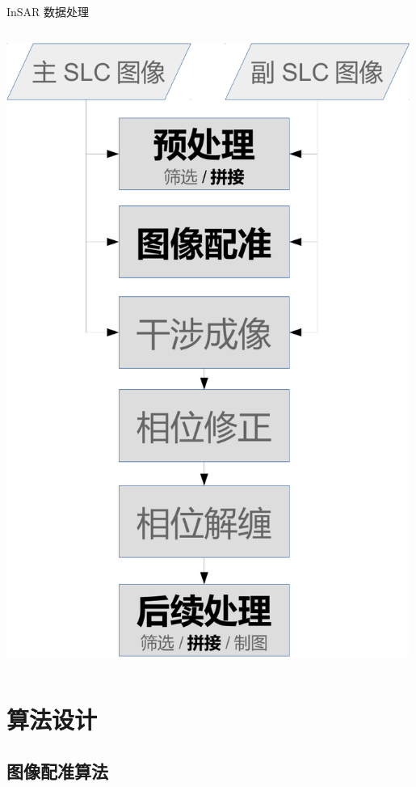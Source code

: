 \documentclass{beamer}
\begin{document}
\begin{frame}{InSAR 数据处理}
\begin{columns}
\begin{column}{0.4\textwidth}
            \includegraphics[width=0.99\textwidth]{figures/process.pdf}
        \end{column}
    \end{columns}
\end{frame}

\section{算法设计}
\subsection{图像配准算法}
\end{document}
